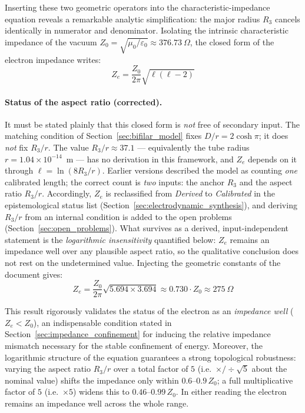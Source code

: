 \documentclass[11pt,a4paper]{article}
\theoremstyle{plain}
\theoremstyle{remark}
\begin{document}
Inserting these two geometric operators into the characteristic-impedance equation reveals a remarkable analytic simplification: the major radius $R_3$ cancels identically in numerator and denominator. Isolating the intrinsic characteristic impedance of the vacuum $Z_0 = \sqrt{\mu_0/\varepsilon_0} \approx 376.73~\Omega$, the closed form of the electron impedance writes:
\begin{equation}
Z_e = \frac{Z_0}{2\pi} \sqrt{\ell(\ell - 2)}
\end{equation}

\paragraph{Status of the aspect ratio (corrected).} It must be stated plainly that this closed form is \emph{not} free of secondary input. The matching condition of Section~\ref{sec:bifilar_model} fixes $D/r = 2\cosh\pi$; it does \emph{not} fix $R_3/r$. The value $R_3/r \approx 37.1$ --- equivalently the tube radius $r = 1.04\times10^{-14}$~m --- has no derivation in this framework, and $Z_e$ depends on it through $\ell = \ln(8R_3/r)$. Earlier versions described the model as counting \emph{one} calibrated length; the correct count is \emph{two} inputs: the anchor $R_3$ and the aspect ratio $R_3/r$. Accordingly, $Z_e$ is reclassified from \emph{Derived} to \emph{Calibrated} in the epistemological status list (Section~\ref{sec:electrodynamic_synthesis}), and deriving $R_3/r$ from an internal condition is added to the open problems (Section~\ref{sec:open_problems}). What survives as a derived, input-independent statement is the \emph{logarithmic insensitivity} quantified below: $Z_e$ remains an impedance well over any plausible aspect ratio, so the qualitative conclusion does not rest on the undetermined value. Injecting the geometric constants of the document gives:
\begin{equation}
Z_e = \frac{Z_0}{2\pi} \sqrt{5.694 \times 3.694} \approx 0.730 \cdot Z_0 \approx 275~\Omega
\end{equation}

This result rigorously validates the status of the electron as an \textit{impedance well} ($Z_e < Z_0$), an indispensable condition stated in Section~\ref{sec:impedance_confinement} for inducing the relative impedance mismatch necessary for the stable confinement of energy. Moreover, the logarithmic structure of the equation guarantees a strong topological robustness: varying the aspect ratio $R_3/r$ over a total factor of $5$ (i.e.\ $\times/\!\div\sqrt5$ about the nominal value) shifts the impedance only within $0.6$--$0.9\,Z_0$; a full multiplicative factor of $5$ (i.e.\ $\times5$) widens this to $0.46$--$0.99\,Z_0$. In either reading the electron remains an impedance well across the whole range.
\end{document}
